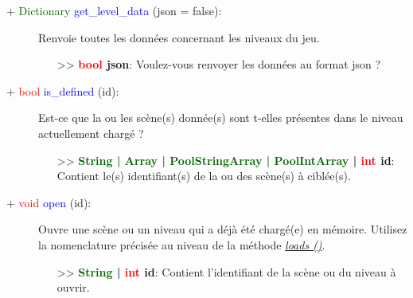 \documentclass[a4paper, 11pt]{article}
\begin{document}
	\begin{description}
		\item [+ \textcolor{darkgreen}{Dictionary} \textcolor{blue}{get\_level\_data} (json = false):] 
		Renvoie toutes les données concernant les niveaux du jeu.
		\begin{itemize}
			\item [>> \textbf{\textcolor{red}{bool} json}:] Voulez-vous renvoyer les données au format json 
			?\\
		\end{itemize}
	\end{description}
	\begin{description}
		\item [+ \textcolor{red}{bool} \textcolor{blue}{is\_defined} (id):] Est-ce que la ou les scène(s)  
		donnée(s) sont t-elles présentes dans le niveau actuellement chargé ?
		\begin{itemize}
			\item [>> \textbf{\textcolor{darkgreen}{String | Array | PoolStringArray | PoolIntArray} |
			\textcolor{red}{int} id}:] Contient le(s) identifiant(s) de la ou des scène(s) à ciblée(s).\\
		\end{itemize}
	\end{description}
	\begin{description}
		\item [+ \textcolor{red}{void} \textcolor{blue}{open} (id):] Ouvre une scène ou un niveau qui a déjà 
		été chargé(e) en mémoire. Utilisez la nomenclature précisée au niveau de la méthode 
		\textit{\hyperlink{load}{loads ()}}.
		\begin{itemize}
			\item [>> \textbf{\textcolor{darkgreen}{String} | \textcolor{red}{int} id}:] Contient
			l'identifiant de la scène ou du niveau à ouvrir.
		\end{itemize}
	\end{description}
\end{document}
